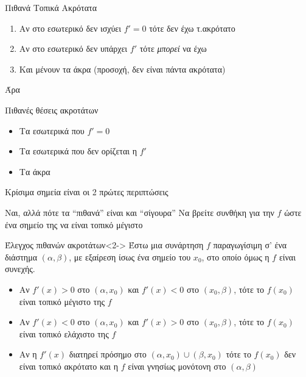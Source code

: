 \documentclass{presentation}
\begin{document}
\begin{frame}{Πιθανά Τοπικά Ακρότατα}
  \begin{enumerate}
    \item<1-> Αν στο εσωτερικό δεν ισχύει $f'=0$ τότε δεν έχω τ.ακρότατο
    \item<2-> Αν στο εσωτερικό δεν υπάρχει $f'$ τότε \emph{μπορεί} να έχω
    \item<3-> Και μένουν τα άκρα (προσοχή, δεν είναι πάντα ακρότατα)
  \end{enumerate}

  Άρα
  \begin{block}{Πιθανές θέσεις ακροτάτων}
    \begin{itemize}
      \item Τα εσωτερικά που $f'=0$
      \item Τα εσωτερικά που δεν ορίζεται η $f'$
      \item Τα άκρα

    \end{itemize}
  \end{block}

  Κρίσιμα σημεία είναι οι 2 πρώτες περιπτώσεις

\end{frame}

\begin{frame}{Ναι, αλλά πότε τα ``πιθανά'' είναι και ``σίγουρα''}
  Να βρείτε συνθήκη για την $f$ ώστε ένα σημείο της να είναι τοπικό μέγιστο
  \begin{block}{Έλεγχος πιθανών ακροτάτων}<2->
    Έστω μια συνάρτηση $f$ παραγωγίσιμη σ’ ένα διάστημα $(α, β)$, με εξαίρεση ίσως ένα σημείο του $x_0$, στο οποίο όμως η $f$ είναι συνεχής.

    \begin{itemize}
      \item Αν $f'(x) > 0$ στο $(α, x_0)$ και $f'(x) < 0$ στο $(x_0, β)$, τότε το $f(x_0)$ είναι τοπικό μέγιστο της $f$
      \item Αν $f'(x)< 0$ στο $(α, x_0)$ και $f'(x) > 0$ στο $(x_0, β)$, τότε το $f(x_0)$ είναι τοπικό ελάχιστο της $f$
      \item Aν η $f'(x)$ διατηρεί πρόσημο στο $(α,x_0)\cup(β,x_0)$ τότε το $f(x_0)$ δεν είναι τοπικό ακρότατο και η $f$ είναι γνησίως μονότονη στο $(α, β)$

    \end{itemize}
  \end{block}

\end{frame}
\end{document}
